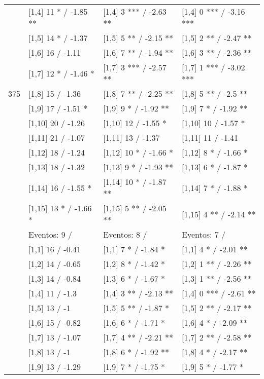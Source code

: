 \begin{table}
\begin{tabular}[t]{llll}
\addlinespace
 & {}[1,4] 11 * / -1.85 ** & {}[1,4] 3 *** / -2.63 ** & {}[1,4] 0 *** / -3.16 ***\\
 & {}[1,5] 14 * / -1.37 & {}[1,5] 5 ** / -2.15 ** & {}[1,5] 2 ** / -2.47 **\\
 & {}[1,6] 16  / -1.11 & {}[1,6] 7 ** / -1.94 ** & {}[1,6] 3 ** / -2.36 **\\
 & {}[1,7] 12 * / -1.46 * & {}[1,7] 3 *** / -2.57 ** & {}[1,7] 1 *** / -3.02 ***\\
375 & {}[1,8] 15  / -1.36 & {}[1,8] 7 ** / -2.25 ** & {}[1,8] 5 ** / -2.5 **\\
\addlinespace
 & {}[1,9] 17  / -1.51 * & {}[1,9] 9 * / -1.92 ** & {}[1,9] 7 * / -1.92 **\\
 & {}[1,10] 20  / -1.26 & {}[1,10] 12  / -1.55 * & {}[1,10] 10  / -1.57 *\\
 & {}[1,11] 21  / -1.07 & {}[1,11] 13  / -1.37 & {}[1,11] 11  / -1.41\\
 & {}[1,12] 18  / -1.24 & {}[1,12] 10 * / -1.66 * & {}[1,12] 8 * / -1.66 *\\
 & {}[1,13] 18  / -1.32 & {}[1,13] 9 * / -1.93 ** & {}[1,13] 6 * / -1.87 *\\
\addlinespace
 & {}[1,14] 16  / -1.55 * & {}[1,14] 10 * / -1.87 ** & {}[1,14] 7 * / -1.88 *\\
 & {}[1,15] 13 * / -1.66 * & {}[1,15] 5 ** / -2.05 ** & {}[1,15] 4 ** / -2.14 **\\
 & Eventos:  9 / & Eventos:  8 / & Eventos:  7 /\\
 & {}[1,1] 16  / -0.41 & {}[1,1] 7 * / -1.84 * & {}[1,1] 4 * / -2.01 **\\
 & {}[1,2] 14  / -0.65 & {}[1,2] 8 * / -1.42 * & {}[1,2] 1 ** / -2.26 **\\
\addlinespace
 & {}[1,3] 14  / -0.84 & {}[1,3] 6 * / -1.67 * & {}[1,3] 1 ** / -2.56 **\\
 & {}[1,4] 11  / -1.3 & {}[1,4] 3 ** / -2.13 ** & {}[1,4] 0 *** / -2.61 **\\
 & {}[1,5] 13  / -1 & {}[1,5] 5 ** / -1.87 * & {}[1,5] 2 ** / -2.17 **\\
 & {}[1,6] 15  / -0.82 & {}[1,6] 6 * / -1.71 * & {}[1,6] 4 * / -2.09 **\\
 & {}[1,7] 13  / -1.07 & {}[1,7] 4 ** / -2.21 ** & {}[1,7] 2 ** / -2.58 **\\
\addlinespace
500 & {}[1,8] 13  / -1 & {}[1,8] 6 * / -1.92 ** & {}[1,8] 4 * / -2.17 **\\
 & {}[1,9] 13  / -1.29 & {}[1,9] 7 * / -1.75 * & {}[1,9] 5 * / -1.77 *\\

\end{tabular}
\end{table}
